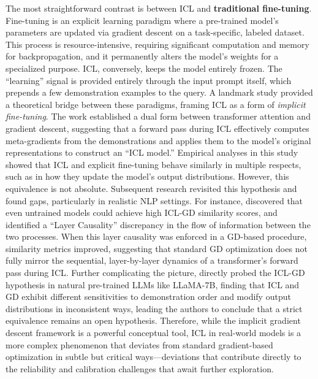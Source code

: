 \documentclass[11pt]{article}
\begin{document}
The most straightforward contrast is between ICL and \textbf{traditional fine-tuning}. Fine-tuning is an explicit learning paradigm where a pre-trained model's parameters are updated via gradient descent on a task-specific, labeled dataset. This process is resource-intensive, requiring significant computation and memory for backpropagation, and it permanently alters the model's weights for a specialized purpose. ICL, conversely, keeps the model entirely frozen. The ``learning'' signal is provided entirely through the input prompt itself, which prepends a few demonstration examples to the query. A landmark study \cite{ref25} provided a theoretical bridge between these paradigms, framing ICL as a form of \emph{implicit fine-tuning}. The work established a dual form between transformer attention and gradient descent, suggesting that a forward pass during ICL effectively computes meta-gradients from the demonstrations and applies them to the model's original representations to construct an ``ICL model.'' Empirical analyses in this study showed that ICL and explicit fine-tuning behave similarly in multiple respects, such as in how they update the model's output distributions. However, this equivalence is not absolute. Subsequent research revisited this hypothesis and found gaps, particularly in realistic NLP settings. For instance, \cite{ref10} discovered that even untrained models could achieve high ICL-GD similarity scores, and identified a ``Layer Causality'' discrepancy in the flow of information between the two processes. When this layer causality was enforced in a GD-based procedure, similarity metrics improved, suggesting that standard GD optimization does not fully mirror the sequential, layer-by-layer dynamics of a transformer's forward pass during ICL. Further complicating the picture, \cite{ref26} directly probed the ICL-GD hypothesis in natural pre-trained LLMs like LLaMA-7B, finding that ICL and GD exhibit different sensitivities to demonstration order and modify output distributions in inconsistent ways, leading the authors to conclude that a strict equivalence remains an open hypothesis. Therefore, while the implicit gradient descent framework is a powerful conceptual tool, ICL in real-world models is a more complex phenomenon that deviates from standard gradient-based optimization in subtle but critical ways---deviations that contribute directly to the reliability and calibration challenges that await further exploration.
\end{document}
